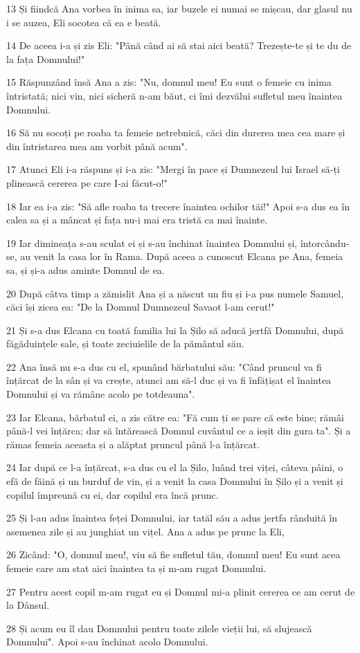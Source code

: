 \par 13 Și fiindcă Ana vorbea în inima sa, iar buzele ei numai se mișcau, dar glasul nu i se auzea, Eli socotea că ea e beată.
\par 14 De aceea i-a și zis Eli: "Până când ai să stai aici beată? Trezește-te și te du de la fața Domnului!"
\par 15 Răspunzând însă Ana a zis: "Nu, domnul meu! Eu sunt o femeie cu inima întristată; nici vin, nici sicheră n-am băut, ci îmi dezvălui sufletul meu înaintea Domnului.
\par 16 Să nu socoți pe roaba ta femeie netrebnică, căci din durerea mea cea mare și din întristarea mea am vorbit până acum".
\par 17 Atunci Eli i-a răspuns și i-a zis: "Mergi în pace și Dumnezeul lui Israel să-ți plinească cererea pe care I-ai făcut-o!"
\par 18 Iar ea i-a zis: "Să afle roaba ta trecere înaintea ochilor tăi!" Apoi s-a dus ea în calea sa și a mâncat și fața nu-i mai era tristă ca mai înainte.
\par 19 Iar dimineața s-au sculat ei și s-au închinat înaintea Domnului și, întorcându-se, au venit la casa lor în Rama. După aceea a cunoscut Elcana pe Ana, femeia sa, și și-a adus aminte Domnul de ea.
\par 20 După câtva timp a zămislit Ana și a născut un fiu și i-a pus numele Samuel, căci își zicea ea: "De la Domnul Dumnezeul Savaot l-am cerut!"
\par 21 Și s-a dus Elcana cu toată familia lui la Șilo să aducă jertfă Domnului, după făgăduințele sale, și toate zeciuielile de la pământul său.
\par 22 Ana însă nu s-a dus cu el, spunând bărbatului său: "Când pruncul va fi înțărcat de la sân și va crește, atunci am să-l duc și va fi înfățișat el înaintea Domnului și va rămâne acolo pe totdeauna".
\par 23 Iar Elcana, bărbatul ei, a zis către ea: "Fă cum ți se pare că este bine; rămâi până-l vei înțărca; dar să întărească Domnul cuvântul ce a ieșit din gura ta". Și a rămas femeia aceasta și a alăptat pruncul până l-a înțărcat.
\par 24 Iar după ce l-a înțărcat, s-a dus cu el la Șilo, luând trei viței, câteva pâini, o efă de făină și un burduf de vin, și a venit la casa Domnului în Șilo și a venit și copilul împreună cu ei, dar copilul era încă prunc.
\par 25 Și l-au adus înaintea feței Domnului, iar tatăl său a adus jertfa rânduită în asemenea zile și au junghiat un vițel. Ana a adus pe prunc la Eli,
\par 26 Zicând: "O, domnul meu!, viu să fie sufletul tău, domnul meu! Eu sunt acea femeie care am stat aici înaintea ta și m-am rugat Domnului.
\par 27 Pentru acest copil m-am rugat eu și Domnul mi-a plinit cererea ce am cerut de la Dânsul.
\par 28 Și acum eu îl dau Domnului pentru toate zilele vieții lui, să slujească Domnului". Apoi s-au închinat acolo Domnului.

